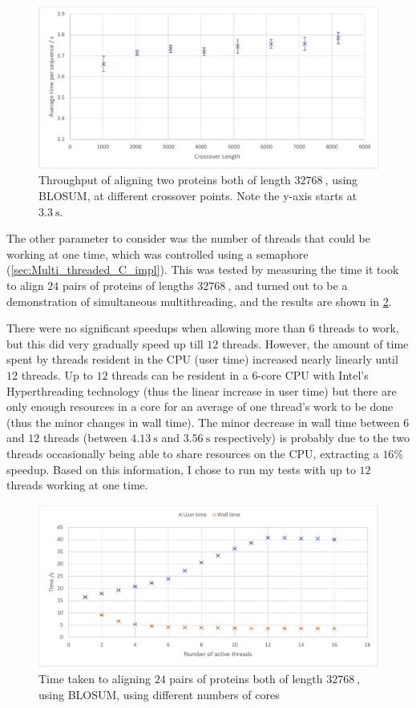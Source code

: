 \begin{figure}[H]
    \centering
    \includegraphics[width=\textwidth]{figs/eval/c_crossover.pdf}
    \caption{Throughput of aligning two proteins both of length $\SI{32768}{}$, using BLOSUM, at different crossover points. Note the y-axis starts at $\SI{3.3}{\s}$.}
    \label{fig:C_Crossover}
\end{figure}

The other parameter to consider was the number of threads that could be working at one time, which was controlled using a semaphore (\cref{sec:Multi_threaded_C_impl}).
This was tested by measuring the time it took to align $24$ pairs of proteins of lengths $\SI{32768}{}$, and turned out to be a demonstration of simultaneous multithreading, and the results are shown in \cref{fig:C_Cores}.

There were no significant speedups when allowing more than $6$ threads to work, but this did very gradually speed up till $12$ threads.
However, the amount of time spent by threads resident in the CPU (user time) increased nearly linearly until $12$ threads.
Up to $12$ threads can be resident in a 6-core CPU with Intel's Hyperthreading technology (thus the linear increase in user time) but there are only enough resources in a core for an average of one thread's work to be done (thus the minor changes in wall time).
The minor decrease in wall time between $6$ and $12$ threads (between $\SI{4.13}{\s}$ and $\SI{3.56}{\s}$ respectively) is probably due to the two threads occasionally being able to share resources on the CPU, extracting a $16\%$ speedup.
Based on this information, I chose to run my tests with up to $12$ threads working at one time.

\begin{figure}
    \centering
    \includegraphics[width=\textwidth]{figs/eval/c_cores.pdf}
    \caption{Time taken to aligning $24$ pairs of proteins both of length $\SI{32768}{}$, using BLOSUM, using different numbers of cores}
    \label{fig:C_Cores}
\end{figure}

